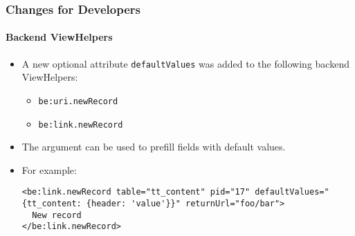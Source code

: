 %

\begin{frame}[fragile]
	\frametitle{Changes for Developers}
	\framesubtitle{Backend ViewHelpers}


	\begin{itemize}
		\item A new optional attribute \texttt{defaultValues} was added to the following
			backend ViewHelpers:

			\begin{itemize}\smaller
				\item \texttt{be:uri.newRecord}
				\item \texttt{be:link.newRecord}
			\end{itemize}\normalsize

		\item The argument can be used to prefill fields with default values.
		\item For example:
\begin{lstlisting}
<be:link.newRecord table="tt_content" pid="17" defaultValues="{tt_content: {header: 'value'}}" returnUrl="foo/bar">
  New record
</be:link.newRecord>
\end{lstlisting}
	\end{itemize}

\end{frame}

